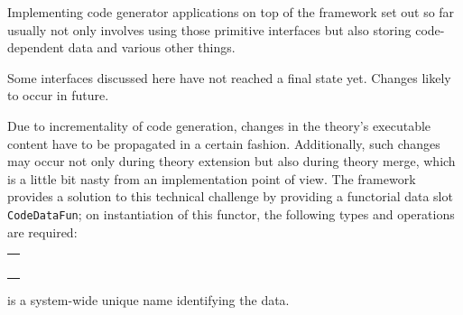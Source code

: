 \begin{isabellebody}
\begin{isamarkuptext}
\begin{description}
  \end{description}%
\end{isamarkuptext}%
\isamarkuptrue%
%
\endisatagmlref
{\isafoldmlref}%
%
\isadelimmlref
%
\endisadelimmlref
%
\isamarkuptrue%
%
\begin{isamarkuptext}%
Implementing code generator applications on top
  of the framework set out so far usually not only
  involves using those primitive interfaces
  but also storing code-dependent data and various
  other things.

  \begin{warn}
    Some interfaces discussed here have not reached
    a final state yet.
    Changes likely to occur in future.
  \end{warn}%
\end{isamarkuptext}%
\isamarkuptrue%
%
\isamarkuptrue%
%
\begin{isamarkuptext}%
Due to incrementality of code generation, changes in the
  theory's executable content have to be propagated in a
  certain fashion.  Additionally, such changes may occur
  not only during theory extension but also during theory
  merge, which is a little bit nasty from an implementation
  point of view.  The framework provides a solution
  to this technical challenge by providing a functorial
  data slot \verb|CodeDataFun|; on instantiation
  of this functor, the following types and operations
  are required:

  \medskip
  \begin{tabular}{l}
  \isa{val\ name{\isacharcolon}\ string} \\
  \isa{type\ T} \\
  \isa{val\ empty{\isacharcolon}\ T} \\
  \isa{val\ merge{\isacharcolon}\ Pretty{\isachardot}pp\ {\isasymrightarrow}\ T\ {\isacharasterisk}\ T\ {\isasymrightarrow}\ T} \\
  \isa{val\ purge{\isacharcolon}\ theory\ option\ {\isasymrightarrow}\ CodegenConsts{\isachardot}const\ list\ option\ {\isasymrightarrow}\ T\ {\isasymrightarrow}\ T}
  \end{tabular}

  \begin{description}

  \item {} is a system-wide unique name identifying the data.


\end{description}
\end{isamarkuptext}
\end{isabellebody}
